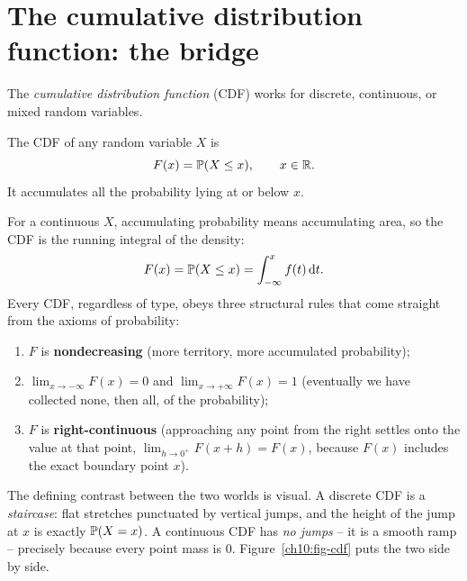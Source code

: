 \section{The cumulative distribution function: the bridge}
\label{ch10:cdf}

The \emph{cumulative distribution function} (CDF) works for discrete, continuous,
or mixed random variables.

\begin{definition}[CDF]
\label{ch10:def-cdf}
The CDF of any random variable $X$ is
\[
  F(x) = \P(X \le x), \qquad x \in \R .
\]
It accumulates all the probability lying at or below $x$.
\end{definition}

For a continuous $X$, accumulating probability means accumulating area, so the CDF
is the running integral of the density:
\[
  F(x) = \P(X \le x) = \int_{-\infty}^{x} f(t)\,\dd t .
\]
Every CDF, regardless of type, obeys three structural rules that come straight from
the axioms of probability:
\begin{enumerate}
\item $F$ is \textbf{nondecreasing} (more territory, more accumulated probability);
\item $\displaystyle \lim_{x \to -\infty} F(x) = 0$ and
      $\displaystyle \lim_{x \to +\infty} F(x) = 1$ (eventually we have collected
      none, then all, of the probability);
\item $F$ is \textbf{right-continuous} (approaching any point from the right
      settles onto the value at that point, $\lim_{h \to 0^+} F(x+h) = F(x)$,
      because $F(x)$ includes the exact boundary point $x$).
\end{enumerate}
The defining contrast between the two worlds is visual. A discrete CDF is a
\emph{staircase}: flat stretches punctuated by vertical jumps, and the height of
the jump at $x$ is exactly $\P(X=x)$. A continuous CDF has \emph{no jumps} -- it is
a smooth ramp -- precisely because every point mass is $0$. Figure~\ref{ch10:fig-cdf}
puts the two side by side.


